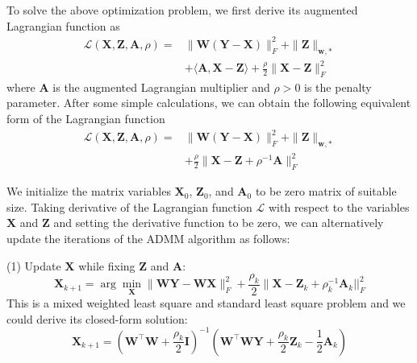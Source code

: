 \documentclass[10pt,twocolumn,letterpaper]{article}
\begin{document}
To solve the above optimization problem, we first derive its augmented Lagrangian function as 
\begin{equation}
\begin{split}
\mathcal{L}(\mathbf{X},\mathbf{Z},\mathbf{A},\rho)
=
&\|\mathbf{W}(\mathbf{Y}-\mathbf{X})\|_{F}^{2}
+
\|\mathbf{Z}\|_{\bm{w},*}
\\
&
+
\langle
\mathbf{A},\mathbf{X}-\mathbf{Z}
\rangle
+
\frac{\rho}{2}
\|\mathbf{X}-\mathbf{Z}\|_{F}^{2}
\end{split}
\end{equation}
where $\mathbf{A}$ is the augmented Lagrangian multiplier and $\rho>0$ is the penalty parameter. 
After some simple calculations, we can obtain the following equivalent form of the Lagrangian function
\begin{equation}
\begin{split}
\mathcal{L}(\mathbf{X},\mathbf{Z},\mathbf{A},\rho)
=
&
\|\mathbf{W}(\mathbf{Y}-\mathbf{X})\|_{F}^{2}
+
\|\mathbf{Z}\|_{\bm{w},*}
\\
&
+
\frac{\rho}{2}
\|\mathbf{X}-\mathbf{Z}+\rho^{-1}\mathbf{A}\|_{F}^{2}
\end{split}
\end{equation}

We initialize the matrix variables $\mathbf{X}_{0}$, $\mathbf{Z}_{0}$, and $\mathbf{A}_{0}$ to be zero matrix of suitable size.
Taking derivative of the Lagrangian function $\mathcal{L}$ with respect to the variables $\mathbf{X}$ and $\mathbf{Z}$ and setting the derivative function to be zero, we can alternatively update the iterations of the ADMM algorithm as follows:

(1) Update $\mathbf{X}$ while fixing $\mathbf{Z}$ and $\mathbf{A}$:
\begin{equation}
\mathbf{X}_{k+1}
=
\arg\min_{\mathbf{X}}
\|\mathbf{W}\mathbf{Y} - \mathbf{W}\mathbf{X}\|_{F}^{2} 
+
\frac{\rho_{k}}{2}\|\mathbf{X} - \mathbf{Z}_{k} + \rho_{k}^{-1}\mathbf{A}_{k}||_{F}^{2}
\end{equation}
This is a mixed weighted least square and standard least square problem and we could derive its closed-form solution:
\begin{equation}
\mathbf{X}_{k+1}
=
(\mathbf{W}^{\top}\mathbf{W}+\frac{\rho_{k}}{2}\mathbf{I})^{-1}
(\mathbf{W}^{\top}\mathbf{W}\mathbf{Y} + \frac{\rho_{k}}{2}\mathbf{Z}_{k} -\frac{1}{2}\mathbf{A}_{k})
\end{equation}
\end{document}
